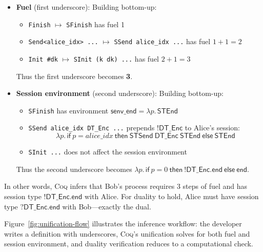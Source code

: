\documentclass[11pt]{article}
\newcommand{\coqin}[1]{\texttt{#1}}
\newcommand{\coq}{\textsc{Coq}}
\begin{document}
\begin{itemize}
  \item \textbf{Fuel} (first underscore): Building bottom-up:
    \begin{itemize}
      \item \coqin{Finish} $\mapsto$ \coqin{SFinish} has fuel 1
      \item \coqin{Send<alice\_idx> ...} $\mapsto$ \coqin{SSend alice\_idx ...} has fuel $1+1 = 2$
      \item \coqin{Init \#dk} $\mapsto$ \coqin{SInit (k dk) ...} has fuel $2+1 = 3$
    \end{itemize}
    Thus the first underscore becomes \textbf{3}.
    
  \item \textbf{Session environment} (second underscore): Building bottom-up:
    \begin{itemize}
      \item \coqin{SFinish} has environment $\mathsf{senv\_end} = \lambda p.\, \mathsf{STEnd}$
      \item \coqin{SSend alice\_idx DT\_Enc ...} prepends $\mathsf{!DT\_Enc}$ to Alice's session:
        \[
          \lambda p.\, \mathsf{if}~p = \mathit{alice\_idx}~\mathsf{then}~\mathsf{STSend}~\mathsf{DT\_Enc}~\mathsf{STEnd}~\mathsf{else}~\mathsf{STEnd}
        \]
      \item \coqin{SInit ...} does not affect the session environment
    \end{itemize}
    Thus the second underscore becomes
    $\lambda p.\, \mathsf{if}~p = 0~\mathsf{then}~\mathsf{!DT\_Enc.end}~\mathsf{else}~\mathsf{end}$.
\end{itemize}

\noindent
In other words, \coq{} infers that Bob's process requires 3 steps of fuel and
has session type $\mathsf{!DT\_Enc.end}$ with Alice. For duality to hold,
Alice must have session type $\mathsf{?DT\_Enc.end}$ with Bob---exactly
the dual.

Figure~\ref{fig:unification-flow} illustrates the inference workflow:
the developer writes a definition with underscores, \coq{}'s unification
solves for both fuel and session environment, and duality verification
reduces to a computational check.
\end{document}
